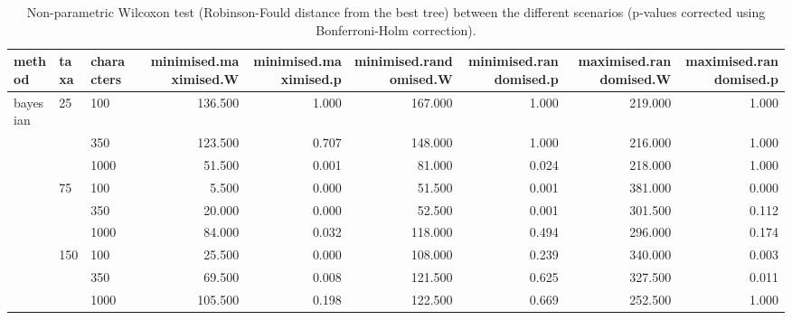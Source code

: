 \begin{table}[ht]
\centering
\begin{tabular}{lllrrrrrr}
  \hline
method & taxa & characters & minimised.maximised.W & minimised.maximised.p & minimised.randomised.W & minimised.randomised.p & maximised.randomised.W & maximised.randomised.p \\ 
  \hline
bayesian & 25 & 100 & 136.500 & 1.000 & 167.000 & 1.000 & 219.000 & 1.000 \\ 
   &  & 350 & 123.500 & 0.707 & 148.000 & 1.000 & 216.000 & 1.000 \\ 
   &  & 1000 & 51.500 & 0.001 & 81.000 & 0.024 & 218.000 & 1.000 \\ 
   & 75 & 100 & 5.500 & 0.000 & 51.500 & 0.001 & 381.000 & 0.000 \\ 
   &  & 350 & 20.000 & 0.000 & 52.500 & 0.001 & 301.500 & 0.112 \\ 
   &  & 1000 & 84.000 & 0.032 & 118.000 & 0.494 & 296.000 & 0.174 \\ 
   & 150 & 100 & 25.500 & 0.000 & 108.000 & 0.239 & 340.000 & 0.003 \\ 
   &  & 350 & 69.500 & 0.008 & 121.500 & 0.625 & 327.500 & 0.011 \\ 
   &  & 1000 & 105.500 & 0.198 & 122.500 & 0.669 & 252.500 & 1.000 \\ 
   \hline
\end{tabular}
\caption{Non-parametric Wilcoxon test (Robinson-Fould distance from the best tree) between the different scenarios (p-values corrected using Bonferroni-Holm correction).} 
\label{Full_Tab_Bayesian_WXRFbest}
\end{table}
